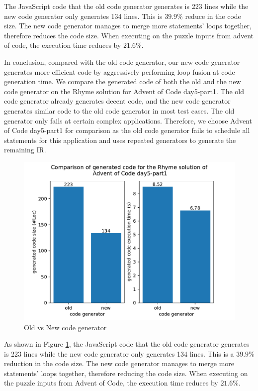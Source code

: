 \documentclass[sigplan, nonacm]{acmart}\settopmatter{printfolios=true,printccs=false,printacmref=false}
\begin{document}
The JavaScript code that the old code generator generates is 223 lines while the new code generator only generates 134 lines. This is $39.9\%$ reduce in the code size. The new code generator manages to merge more statements' loops together, therefore reduces the code size. When executing on the puzzle inputs from advent of code, the execution time reduces by $21.6\%$.\par
In conclusion, compared with the old code generator, our new code generator generates more efficient code by aggressively performing loop fusion at code generation time.
\fi
We compare the generated code of both the old and the new code generator on the Rhyme solution for Advent of Code day5-part1. The old code generator already generates decent code, and the new code generator generates similar code to the old code generator in most test cases. The old generator only fails at certain complex applications. Therefore, we choose Advent of Code day5-part1 for comparison as the old code generator fails to schedule all statements for this application and uses repeated generators to generate the remaining IR.\par
\begin{figure}[H]
  \centering
      \includegraphics[scale=0.57]{figures/evaluation.pdf}
      \caption{Old vs New code generator}
      \label{evaluationpic}
  \end{figure}
As shown in Figure \ref{evaluationpic}, the JavaScript code that the old code generator generates is 223 lines while the new code generator only generates 134 lines. This is a $39.9\%$ reduction in the code size. The new code generator manages to merge more statements' loops together, therefore reducing the code size. When executing on the puzzle inputs from Advent of Code, the execution time reduces by $21.6\%$.\par
\end{document}
